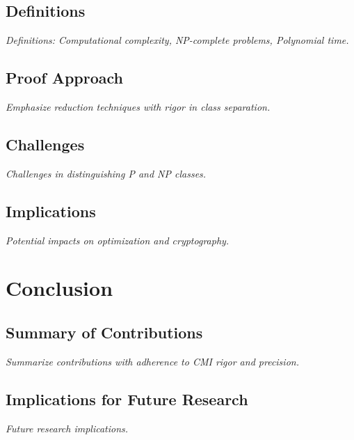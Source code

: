\documentclass[12pt, a4paper]{article}
\begin{document}
\subsection{Definitions}
\textit{Definitions: Computational complexity, NP-complete problems, Polynomial time.}

\subsection{Proof Approach}
\textit{Emphasize reduction techniques with rigor in class separation.}

\subsection{Challenges}
\textit{Challenges in distinguishing P and NP classes.}

\subsection{Implications}
\textit{Potential impacts on optimization and cryptography.}


\section{Conclusion}
\subsection{Summary of Contributions}
\textit{Summarize contributions with adherence to CMI rigor and precision.}

\subsection{Implications for Future Research}
\textit{Future research implications.}

\end{document}

